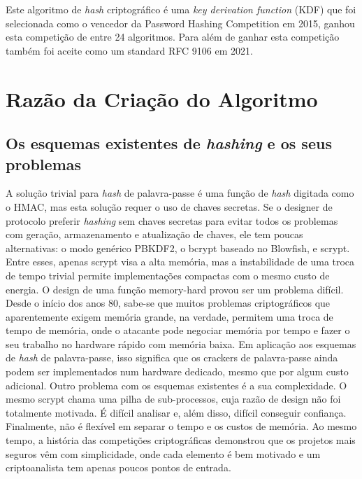\documentclass[conference]{IEEEtran}
\begin{document}
Este algoritmo de \textit{hash} criptográfico é uma \textit{key derivation function} (KDF) que foi 
selecionada como o vencedor da Password Hashing Competition \cite{phc} em 2015, 
ganhou esta competição de entre 24 algoritmos. Para além de ganhar esta 
competição também foi aceite como um standard RFC 9106 \cite{rfc9106} em 2021.


\section{Razão da Criação do Algoritmo}

\subsection{Os esquemas existentes de \textit{hashing} e os seus problemas}

A solução trivial para \textit{hash} de palavra-passe é uma função de \textit{hash} digitada como o HMAC, 
mas esta solução requer o uso de chaves secretas. Se o designer de protocolo 
preferir \textit{hashing} sem chaves secretas para evitar todos os problemas com geração, 
armazenamento e atualização de chaves, ele tem poucas alternativas: 
o modo genérico PBKDF2, o bcrypt baseado no Blowfish, e scrypt. Entre esses, 
apenas scrypt visa a alta memória, mas a instabilidade de uma troca de tempo 
trivial permite implementações compactas com o mesmo custo de energia. 
O design de uma função memory-hard provou ser um problema difícil. Desde o 
início dos anos 80, sabe-se que muitos problemas criptográficos que 
aparentemente exigem memória grande, na verdade, permitem uma troca de 
tempo de memória, onde o atacante pode negociar memória por tempo e 
fazer o seu trabalho no hardware rápido com memória baixa. Em aplicação aos 
esquemas de \textit{hash} de palavra-passe, isso significa que os crackers de palavra-passe ainda podem 
ser implementados num hardware dedicado, mesmo que por algum custo adicional. 
Outro problema com os esquemas existentes é a sua complexidade. O mesmo scrypt 
chama uma pilha de sub-processos, cuja razão de design não foi totalmente motivada. 
É difícil analisar e, além disso, difícil conseguir confiança. Finalmente, 
não é flexível em separar o tempo e os custos de memória. Ao mesmo tempo, 
a história das competições criptográficas demonstrou que os projetos mais 
seguros vêm com simplicidade, onde cada elemento é bem motivado e um 
criptoanalista tem apenas poucos pontos de entrada. 
\end{document}
